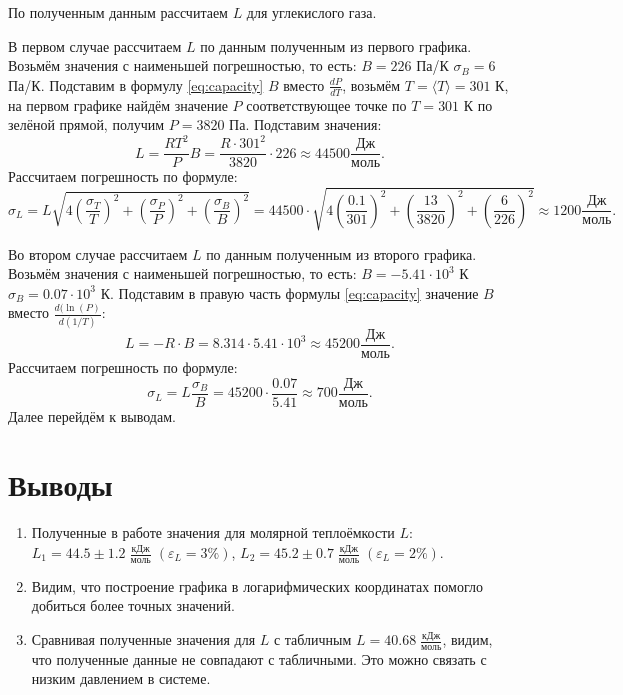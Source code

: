 \documentclass[a4paper,12pt]{article} %
\begin{document}
По полученным данным рассчитаем $L$ для углекислого газа.

В первом случае рассчитаем $L$ по данным полученным из первого графика. Возьмём значения с наименьшей погрешностью, то есть: $B = 226$ Па/К $\sigma_B = 6$ Па/К. Подставим в формулу \ref{eq:capacity} $B$ вместо $\frac{dP}{dT}$, возьмём $T = \langle T \rangle = 301$ К, на первом графике найдём значение $P$ соответствующее точке по $T = 301$ К по зелёной прямой, получим $P = 3820$ Па. Подставим значения:
\[
L = \frac{RT^2}{P} B = \frac{R \cdot 301^2}{3820} \cdot 226 \approx 44500 \frac{\text{Дж}}{\text{моль}}.
\]
Рассчитаем погрешность по формуле:
\[
\sigma_L = L 
\sqrt{4 \left(\frac{\sigma_T}{T} \right)^2 + 
\left(\frac{\sigma_P}{P} \right)^2 + 
\left(\frac{\sigma_B}{B} \right)^2} = 44500 \cdot \sqrt{4 
\left(\frac{0.1}{301}\right)^2 + \left(\frac{13}{3820}\right)^2 + 
\left(\frac{6}{226} \right)^2} \approx 1200 \frac{\text{Дж}}{\text{моль}}.
\]

Во втором случае рассчитаем $L$ по данным полученным из второго графика. Возьмём значения с наименьшей погрешностью, то есть: $B = -5.41 \cdot 10^3 $ К $\sigma_B = 0.07 \cdot 10^3$ К. Подставим в правую часть формулы \ref{eq:capacity} значение $B$ вместо $\frac{d(\ln(P)}{d(1/T)} $:
\[
L = - R \cdot B = 8.314 \cdot 5.41 \cdot 10^3 \approx 45200 \frac{\text{Дж}}{\text{моль}}.
\]
Рассчитаем погрешность по формуле:
\[
\sigma_L = L \frac{\sigma_B}{B} = 45200 \cdot \frac{0.07}{5.41} \approx 700 \frac{\text{Дж}}{\text{моль}}.
\]
Далее перейдём к выводам.

\section{Выводы}

\begin{enumerate}
\itemsep0em

\item Полученные в работе значения для молярной теплоёмкости $L$: $L_1 = 44.5 \pm 1.2 \; \frac{\text{кДж}}{\text{моль}} \; (\varepsilon_L = 3\%)$, $L_2 = 45.2 \pm 0.7 \; \frac{\text{кДж}}{\text{моль}} \; (\varepsilon_L = 2\%)$.

\item Видим, что построение графика в логарифмических координатах помогло добиться более точных значений. 

\item Сравнивая полученные значения для $L$ с табличным $L = 40.68 \; \frac{\text{кДж}}{\text{моль}}$, видим, что полученные данные не совпадают с табличными. Это можно связать с низким давлением в системе.

\end{enumerate}
\end{document}
